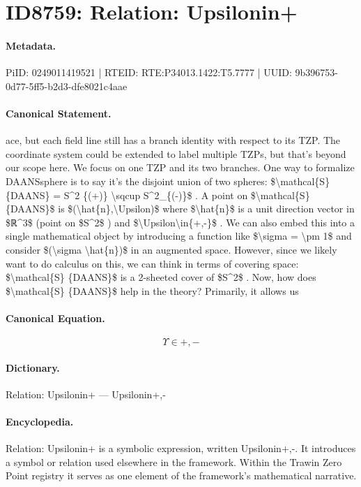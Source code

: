 \section*{ID8759: Relation: Upsilonin+}
\paragraph{Metadata.}
PiID: 0249011419521 | RTEID: RTE:P34013.1422:T5.7777 | UUID: 9b396753-0d77-5ff5-b2d3-dfe8021c4aae

\paragraph{Canonical Statement.}
ace, but each field line still has a branch identity with respect to its TZP. The coordinate system could be extended to label multiple TZPs, but that’s beyond our scope here. We focus on one TZP and its two branches. One way to formalize DAANSsphere is to say it’s the disjoint union of two spheres: \$\textbackslash{}mathcal\{S\} \{DAANS\} = S\textasciicircum{}2 \{(+)\} \textbackslash{}sqcup S\textasciicircum{}2\_\{(-)\}\$ . A point on \$\textbackslash{}mathcal\{S\} \{DAANS\}\$ is \$(\textbackslash{}hat\{n\},\textbackslash{}Upsilon)\$ where \$\textbackslash{}hat\{n\}\$ is a unit direction vector in \$ℝ\textasciicircum{}3\$ (point on \$S\textasciicircum{}2\$ ) and \$\textbackslash{}Upsilon\textbackslash{}in\{+,-\}\$ . We can also embed this into a single mathematical object by introducing a function like \$\textbackslash{}sigma = \textbackslash{}pm 1\$ and consider \$(\textbackslash{}sigma \textbackslash{}hat\{n\})\$ in an augmented space. However, since we likely want to do calculus on this, we can think in terms of covering space: \$\textbackslash{}mathcal\{S\} \{DAANS\}\$ is a 2-sheeted cover of \$S\textasciicircum{}2\$ . Now, how does \$\textbackslash{}mathcal\{S\} \{DAANS\}\$ help in the theory? Primarily, it allows us

\paragraph{Canonical Equation.}
\[
\Upsilon\in{+,-}
\]

\paragraph{Dictionary.}
Relation: Upsilonin+ — Upsilonin+,-

\paragraph{Encyclopedia.}
Relation: Upsilonin+ is a symbolic expression, written Upsilonin+,-. It introduces a symbol or relation used elsewhere in the framework. Within the Trawin Zero Point registry it serves as one element of the framework's mathematical narrative.
